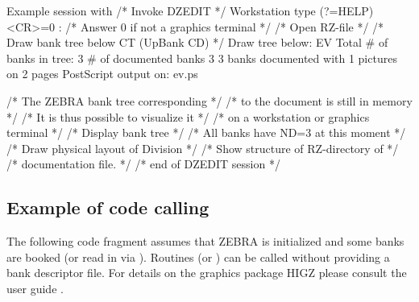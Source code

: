 \begin{XMPt}{Example session with }
                                         /* Invoke DZEDIT                         */
Workstation type (?=HELP) <CR>=0 :             /* Answer 0 if not a graphics terminal   */
                             /* Open RZ-file                          */
                                /* Draw bank tree below CT (UpBank CD)   */
   Draw tree below: EV                         
   Total # of banks in tree:       3       
   # of documented banks           3       
 3 banks documented with  1 pictures on  2 pages
 PostScript output on: ev.ps                  
 
                                               /* The ZEBRA bank tree corresponding     */
                                               /* to the document is still in memory    */
                                               /* It is thus possible to visualize it   */
                                               /* on a workstation or graphics terminal */
                                         /* Display bank tree                     */
                                               /* All banks have ND=3 at this moment    */
                                         /* Draw physical layout of Division      */
                                         /* Show structure of RZ-directory of     */
                                               /* documentation file.                   */
                                           /* end of DZEDIT session                 */
\end{XMPt}
 
\subsection[Example of code calling {\tt DZDDIV}]{Example of code calling }
 
The following code fragment assumes that  ZEBRA is initialized and
some banks are booked (or read in via ). 
Routines  (or ) can be called without providing 
a bank descriptor file. 
For details on the graphics package HIGZ please consult the user guide \cite{bib-HIGZ}.
 
